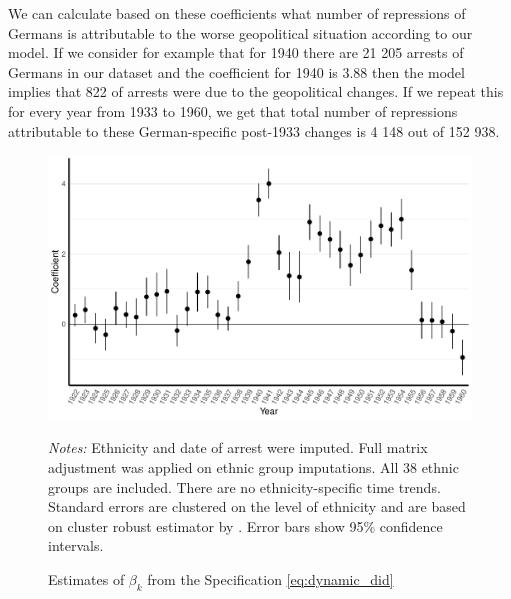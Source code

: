 We can calculate based on these coefficients what number of repressions of Germans is attributable to the worse geopolitical situation according to our model. 
If we consider for example that for 1940 there are 21 205 arrests of Germans in our dataset and the coefficient for 1940 is 3.88 then the model implies that 822 of arrests were due to the geopolitical changes. 
If we repeat this for every year from 1933 to 1960, we get that total number of repressions attributable to these German-specific post-1933 changes is 4 148 out of 152 938. 


 \begin{figure}[h]
\centering
\caption{Estimates of $\beta_k$ from the Specification \ref{eq:dynamic_did}}
\includegraphics[width=\textwidth]{plots/final/fmla_pred_full_imp_date_no_trends_geopol_cr2.pdf}
\begin{minipage}{0.92\textwidth}
\footnotesize
\emph{Notes:} Ethnicity and date of arrest were imputed.  Full matrix adjustment was applied on ethnic group imputations. All 38 ethnic groups are included. 
There are no ethnicity-specific time trends. 
Standard errors are clustered on the level of ethnicity and are based on cluster robust estimator by \citet{pustejovsky_small-sample_2018}. Error bars show 95\% confidence intervals. 
\end{minipage}
\label{fig:did_effets}
\end{figure}

